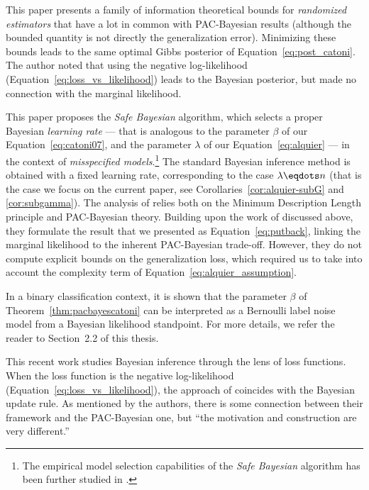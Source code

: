 \documentclass{article}
\theoremstyle{definition}
\theoremstyle{plain}
\newcommand{\citepA}{\citep}
\newcommand{\citetA}{\citet}
\begin{document}
This paper presents a family of information theoretical bounds for \emph{randomized estimators} that have a lot in common with PAC-Bayesian results (although the bounded quantity is not directly the generalization error). Minimizing these bounds leads to the same optimal Gibbs posterior of Equation~\eqref{eq:post_catoni}. The author noted that using the negative log-likelihood (Equation~\ref{eq:loss_vs_likelihood}) leads to the Bayesian posterior, but made no connection with the marginal likelihood.

 This paper proposes the \emph{Safe Bayesian} algorithm, which selects a proper Bayesian \emph{learning rate} --- that is analogous to the parameter $\beta$ of our Equation~\eqref{eq:catoni07}, and the parameter $\lambda$ of our Equation~\eqref{eq:alquier} --- in the context of \emph{misspecified models}.\footnote{The empirical model selection capabilities of the \emph{Safe Bayesian} algorithm has been further studied in \citetA{grunwald-14}.} 
The standard Bayesian inference method is obtained with a fixed learning rate, corresponding to the case $\lambda\eqdots n$ (that is the case we focus on the current paper, see Corollaries~\ref{cor:alquier-subG} and \ref{cor:subgamma}). 
%
The analysis of \citet{grunwald-2012} relies both on the Minimum Description Length principle \citepA{grunwald-07-book} and PAC-Bayesian theory. Building upon the work of \citet{zhang-06} discussed above, they formulate the result that we presented as Equation~\eqref{eq:putback}, linking the marginal likelihood to the inherent PAC-Bayesian trade-off.
However, they do not compute explicit bounds on the generalization loss, which required us to take into account the complexity term of Equation~\eqref{eq:alquier_assumption}.


 In a binary classification context, it is shown that the parameter $\beta$ of Theorem~\ref{thm:pacbayescatoni} can be interpreted as a Bernoulli label noise model from a Bayesian likelihood standpoint. For more details, we refer the reader to Section~2.2 of this thesis.

This recent work studies Bayesian inference through the lens of loss functions. When the loss function is the negative log-likelihood (Equation~\ref{eq:loss_vs_likelihood}), the approach of \citet{bissiri-16} coincides with the Bayesian update rule. As mentioned by the authors, there is some connection between their framework and the PAC-Bayesian one, but ``the motivation and construction are very different.''
\end{document}
